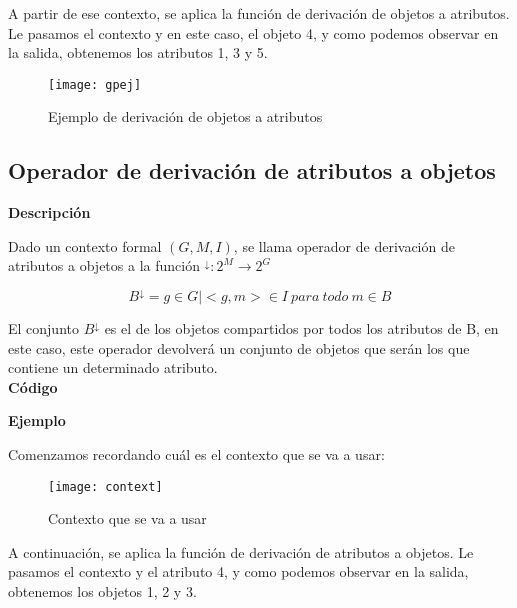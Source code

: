         A partir de ese contexto, se aplica la funci\'on de derivaci\'on de objetos a atributos. 
        Le pasamos el contexto y en este caso, el objeto 4, y como podemos observar en la salida, obtenemos los atributos 1, 3 y 5.

        \begin{figure}[H]
            \centering
            \texttt{[image: gpej]}
            \caption{Ejemplo de derivaci\'on de objetos a atributos}
            \label{fig:gpej}
        \end{figure}



    \subsection{Operador de derivaci\'on de atributos a objetos}

        \textbf{Descripci\'on}

        Dado un contexto formal \( (G, M, I) \), se llama operador de derivaci\'on de atributos a objetos a la 
        funci\'on \( ^\downarrow : 2^M \rightarrow 2^G \)

        \[ B^\downarrow = { g \in G | <g,m> \in I ~ para ~ todo ~ m \in B } \]

        \clearpage

        El conjunto \( B^\downarrow \) es el de los objetos compartidos por todos los atributos de B, en este caso, este operador devolver\'a 
        un conjunto de objetos que ser\'an los que contiene un determinado atributo.
        \\


        \textbf{C\'odigo}

        

        \bigskip

        \textbf{Ejemplo}

        Comenzamos recordando cu\'al es el contexto que se va a usar:

        \begin{figure}[H]
            \centering
            \texttt{[image: context]}
            \caption{Contexto que se va a usar}
            \label{fig:context}
        \end{figure}

        \clearpage

        A continuaci\'on, se aplica la funci\'on de derivaci\'on de atributos a objetos. 
        Le pasamos el contexto y el atributo 4, y como podemos observar en la salida, obtenemos los objetos 1, 2 y 3.

